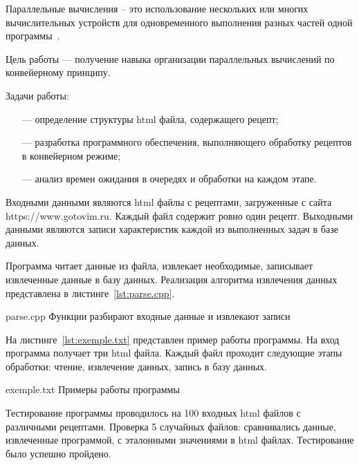 

Параллельные вычисления – это использование нескольких или многих вычислительных устройств для одновременного выполнения разных частей одной программы~\cite{gafarov_paral}.

Цель работы --- получение навыка организации параллельных вычислений по конвейерному принципу.

Задачи работы:
\begin{itemize}
	\item[---] определение структуры html файла, содержащего рецепт;
	\item[---] разработка программного обеспечения, выполняющего обработку рецептов в конвейерном режиме;
	\item[---] анализ времен ожидания в очередях и обработки на каждом этапе.
\end{itemize}



Входными данными являются html файлы с рецептами, загруженные с сайта https://www.gotovim.ru. Каждый файл содержит ровно один рецепт. Выходными данными являются записи характеристик каждой из выполненных задач в базе данных.



Программа читает данные из файла, извлекает необходимые, записывает извлеченные данные в базу данных. Реализация алгоритма извлечения данных представлена в листинге~\ref{lst:parse.cpp}.

{parse.cpp} %
{Функции разбирают входные данные и извлекают записи} %

На листинге~\ref{lst:exemple.txt} представлен пример работы программы. На вход программа получает три html файла. Каждый файл проходит следующие этапы обработки: чтение, извлечение данных, запись в базу данных.

{exemple.txt} %
{Примеры работы программы} %



Тестирование программы проводилось на 100 входных html файлов с различными рецептами. Проверка 5 случайных файлов: сравнивались данные, извлеченные программой, с эталонными значениями в html файлах. Тестирование было успешно пройдено.

